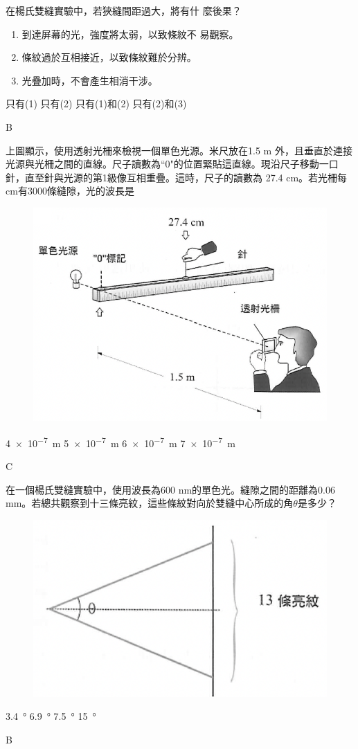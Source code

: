 {
    在楊氏雙縫實驗中，若狹縫間距過大，將有什 麼後果？

    \begin{enumerate}[label=\sd]
        \item 到達屏幕的光，強度將太弱，以致條紋不 易觀察。
              \par
        \item 條紋過於互相接近，以致條紋難於分辨。
              \par
        \item 光疊加時，不會產生相消干涉。
              \par
    \end{enumerate}


    \begin{choices}
        \choice 只有(1)
        \CorrectChoice 只有(2)
        \choice 只有(1)和(2)
        \choice 只有(2)和(3)
    \end{choices}

}{\mckey B}

{
    上圖顯示，使用透射光柵來檢視一個單色光源。米尺放在1.5 m 外，且垂直於連接光源與光柵之間的直線。尺子讀數為``0"的位置緊貼這直線。現沿尺子移動一口針，直至針與光源的第1級像互相重疊。這時，尺子的讀數為 27.4 cm。若光柵每cm有3000條縫隙，光的波長是
    \begin{figure}[h!]
        \centering
        \includegraphics[width=.35\textwidth]{assets/80127820.png}
    \end{figure}
    \begin{choices}
        \choice \qty{4e-7}{m}
        \choice \qty{5e-7}{m}
        \CorrectChoice \qty{6e-7}{m}
        \choice \qty{7e-7}{m}
    \end{choices}

}{\mckey C}

{
    在一個楊氏雙縫實驗中，使用波長為600 nm的單色光。縫隙之間的距離為0.06 mm。若總共觀察到十三條亮紋，這些條紋對向於雙縫中心所成的角$\theta$是多少？
    \begin{figure}[h!]
        \centering
        \includegraphics[width=.3\textwidth]{assets/b6bd221a.png}
    \end{figure}
    \begin{choices}
        \choice \qty{3.4}{\degree}
        \CorrectChoice \qty{6.9}{\degree}
        \choice \qty{7.5}{\degree}
        \choice \qty{15}{\degree}
    \end{choices}

}{\mckey B}


